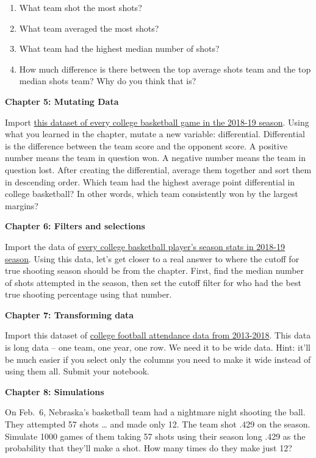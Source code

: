 \documentclass[]{book}
\providecommand{\tightlist}{%
  \setlength{\itemsep}{0pt}\setlength{\parskip}{0pt}}
\begin{document}
\begin{enumerate}
\def\labelenumi{\arabic{enumi}.}
\tightlist
\item
  What team shot the most shots?
\item
  What team averaged the most shots?
\item
  What team had the highest median number of shots?
\item
  How much difference is there between the top average shots team and the top median shots team? Why do you think that is?
\end{enumerate}

\textbf{Chapter 5: Mutating Data}

Import \href{https://unl.box.com/s/a8m91bro10t89watsyo13yjegb1fy009}{this dataset of every college basketball game in the 2018-19 season}. Using what you learned in the chapter, mutate a new variable: differential. Differential is the difference between the team score and the opponent score. A positive number means the team in question won. A negative number means the team in question lost. After creating the differential, average them together and sort them in descending order. Which team had the highest average point differential in college basketball? In other words, which team consistently won by the largest margins?

\textbf{Chapter 6: Filters and selections}

Import the data of \href{https://unl.box.com/s/s1wzw61u9ia50qmirfhuvprgpmmah9rj}{every college basketball player's season stats in 2018-19 season}. Using this data, let's get closer to a real answer to where the cutoff for true shooting season should be from the chapter. First, find the median number of shots attempted in the season, then set the cutoff filter for who had the best true shooting percentage using that number.

\textbf{Chapter 7: Transforming data}

Import this dataset of \href{https://unl.box.com/s/fs3rj0dns1xh2y1dx0c2yc0adh4u3zsy}{college football attendance data from 2013-2018}. This data is long data -- one team, one year, one row. We need it to be wide data. Hint: it'll be much easier if you select only the columns you need to make it wide instead of using them all. Submit your notebook.

\textbf{Chapter 8: Simulations}

On Feb.~6, Nebraska's basketball team had a nightmare night shooting the ball. They attempted 57 shots \ldots{} and made only 12. The team shot .429 on the season. Simulate 1000 games of them taking 57 shots using their season long .429 as the probability that they'll make a shot. How many times do they make just 12?
\end{document}
